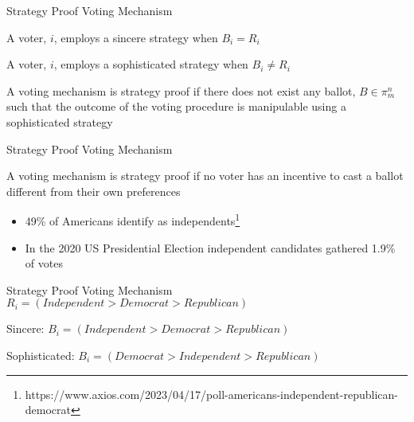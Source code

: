 \documentclass{beamer}
\begin{document}
\begin{frame}{Strategy Proof Voting Mechanism}
    \begin{definition}
        A voter, $i$, employs a sincere strategy when $B_i = R_i$
    \end{definition}

    \begin{definition}
        A voter, $i$, employs a sophisticated strategy when $B_i \ne R_i$
    \end{definition}

    \begin{definition}
        A voting mechanism is strategy proof if there does not exist any ballot, $B \in \pi_m^n$ such that the outcome of the voting procedure is manipulable using a sophisticated strategy
    \end{definition}
\end{frame}

\begin{frame}{Strategy Proof Voting Mechanism}

    \begin{definition}
        A voting mechanism is strategy proof if no voter has an incentive to cast a ballot different from their own preferences
    \end{definition}

    \vskip 0.5cm

\begin{example}

\begin{itemize}
    \item 49\% of Americans identify as independents\footnote{https://www.axios.com/2023/04/17/poll-americans-independent-republican-democrat}
    \item In the 2020 US Presidential Election independent candidates gathered 1.9\% of votes
\end{itemize}
\end{example}
\end{frame}

\begin{frame}{Strategy Proof Voting Mechanism}
   \center  $R_i = (Independent > Democrat > Republican)$

    \vskip 1cm

    Sincere: $B_i = (Independent > Democrat > Republican)$

    \vskip 1cm

    Sophisticated: $B_i = (Democrat > Independent > Republican)$
    
\end{frame}
\end{document}
